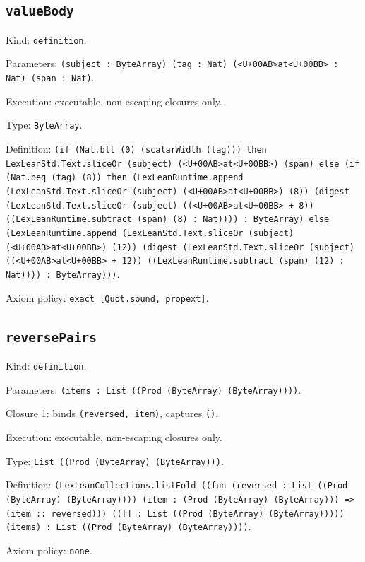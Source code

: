 \documentclass[11pt]{article}
\begin{document}
\subsection*{\texttt{valueBody}}
\noindent Kind: \texttt{definition}.\par
\noindent Parameters: \texttt{(subject : ByteArray) (tag : Nat) (<U+00AB>at<U+00BB> : Nat) (span : Nat)}.\par
\noindent Execution: executable, non-escaping closures only.\par
\noindent Type: \texttt{ByteArray}.\par
\noindent Definition: \texttt{(if (Nat.blt (0) (scalarWidth (tag))) then LexLeanStd.Text.sliceOr (subject) (<U+00AB>at<U+00BB>) (span) else (if (Nat.beq (tag) (8)) then (LexLeanRuntime.append (LexLeanStd.Text.sliceOr (subject) (<U+00AB>at<U+00BB>) (8)) (digest (LexLeanStd.Text.sliceOr (subject) ((<U+00AB>at<U+00BB> + 8)) ((LexLeanRuntime.subtract (span) (8) : Nat)))) : ByteArray) else (LexLeanRuntime.append (LexLeanStd.Text.sliceOr (subject) (<U+00AB>at<U+00BB>) (12)) (digest (LexLeanStd.Text.sliceOr (subject) ((<U+00AB>at<U+00BB> + 12)) ((LexLeanRuntime.subtract (span) (12) : Nat)))) : ByteArray)))}.\par
\noindent Axiom policy: \texttt{exact [Quot.sound, propext]}.\par
\subsection*{\texttt{reversePairs}}
\noindent Kind: \texttt{definition}.\par
\noindent Parameters: \texttt{(items : List ((Prod (ByteArray) (ByteArray))))}.\par
\noindent Closure 1: binds \texttt{(reversed, item)}, captures \texttt{()}.\par
\noindent Execution: executable, non-escaping closures only.\par
\noindent Type: \texttt{List ((Prod (ByteArray) (ByteArray)))}.\par
\noindent Definition: \texttt{(LexLeanCollections.listFold ((fun (reversed : List ((Prod (ByteArray) (ByteArray)))) (item : (Prod (ByteArray) (ByteArray))) => (item :: reversed))) (([] : List ((Prod (ByteArray) (ByteArray))))) (items) : List ((Prod (ByteArray) (ByteArray))))}.\par
\noindent Axiom policy: \texttt{none}.\par
\end{document}
